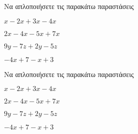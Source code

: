 Να απλοποιήσετε τις παρακάτω παραστάσεις
\begin{alist}
\item $ x-2x+3x-4x $
\item $ 2x-4x-5x+7x $
\item $ 9y-7z+2y-5z $
\item $ -4x+7-x+3 $
\end{alist}
Να απλοποιήσετε τις παρακάτω παραστάσεις
\begin{alist}
\item $ x-2x+3x-4x $
\item $ 2x-4x-5x+7x $
\item $ 9y-7z+2y-5z $
\item $ -4x+7-x+3 $
\end{alist}
